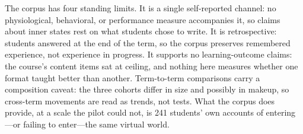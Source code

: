 The corpus has four standing limits.
It is a single self-reported channel: no physiological, behavioral, or
performance measure accompanies it, so claims about inner states rest on what
students chose to write. It is retrospective: students answered at the end of
the term, so the corpus preserves remembered experience, not experience in
progress. It supports no learning-outcome claims: the course's content items
sat at ceiling, and nothing here measures whether one format taught better than
another. Term-to-term comparisons carry a composition caveat: the three cohorts
differ in size and possibly in makeup, so cross-term movements are read as
trends, not tests. What the corpus does provide, at a scale the pilot could
not, is 241 students' own accounts of entering---or failing to enter---the same
virtual world.
